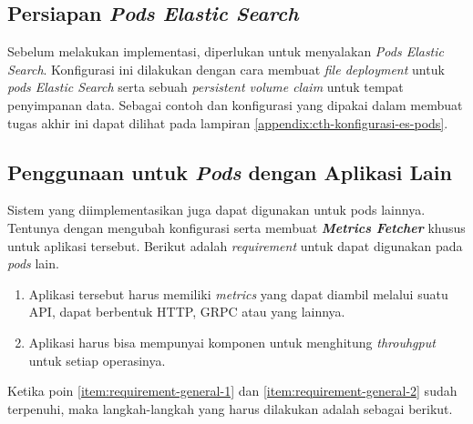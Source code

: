 \subsection{Persiapan \textit{Pods Elastic Search}}

Sebelum melakukan implementasi, diperlukan untuk menyalakan \textit{Pods Elastic Search}. Konfigurasi ini dilakukan dengan cara membuat \textit{file deployment} untuk \textit{pods Elastic Search} serta sebuah \textit{persistent volume claim} untuk tempat penyimpanan data. Sebagai contoh dan konfigurasi yang dipakai dalam membuat tugas akhir ini dapat dilihat pada lampiran \ref{appendix:cth-konfigurasi-es-pods}.





% 


\subsection{Penggunaan untuk \textit{Pods} dengan Aplikasi Lain}

Sistem yang diimplementasikan juga dapat digunakan untuk pods lainnya. Tentunya dengan mengubah konfigurasi serta membuat \textbf{\textit{Metrics Fetcher}} khusus untuk aplikasi tersebut. Berikut adalah \textit{requirement} untuk dapat digunakan pada \textit{pods} lain.

\begin{enumerate}
    \item Aplikasi tersebut harus memiliki \textit{metrics} yang dapat diambil melalui suatu API, dapat berbentuk HTTP, GRPC atau yang lainnya. \label{item:requirement-general-1}
    \item Aplikasi harus bisa mempunyai komponen untuk menghitung \textit{throuhgput} untuk setiap operasinya. \label{item:requirement-general-2}
\end{enumerate}

Ketika poin \ref{item:requirement-general-1} dan \ref{item:requirement-general-2} sudah terpenuhi, maka langkah-langkah yang harus dilakukan adalah sebagai berikut.

